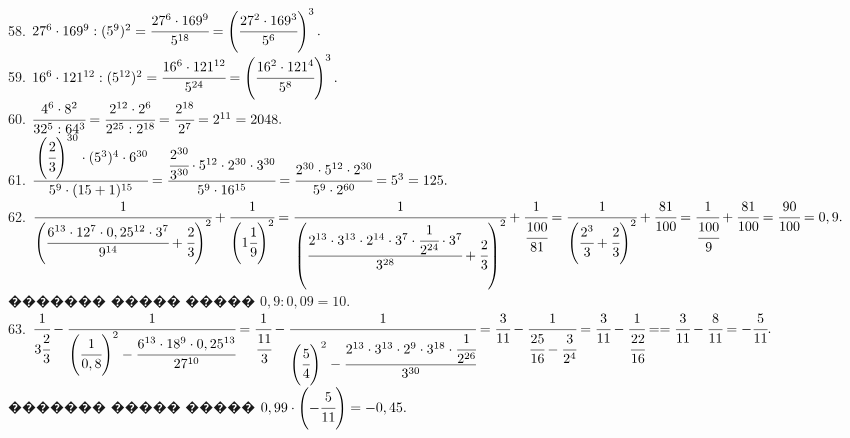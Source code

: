 \documentclass[12pt]{article}
\begin{document}
58. $27^6\cdot169^9:(5^9)^2=\cfrac{27^6\cdot169^9}{5^{18}}=\left(\cfrac{27^2\cdot169^3}{5^6}\right)^3.$\\
59. $16^6\cdot121^{12}:(5^{12})^2=\cfrac{16^6\cdot121^{12}}{5^{24}}=\left(\cfrac{16^2\cdot121^4}{5^8}\right)^3.$\\
60. $\cfrac{4^6\cdot 8^2}{32^5:64^3}=\cfrac{2^{12}\cdot 2^6}{2^{25}:2^{18}}=\cfrac{2^{18}}{2^7}=2^{11}=2048.$\\
61. $\cfrac{\left(\cfrac{2}{3}\right)^{30}\cdot(5^3)^4\cdot6^{30}}{5^9\cdot(15+1)^{15}}=\cfrac{\cfrac{2^{30}}{3^{30}}\cdot5^{12}\cdot2^{30}\cdot3^{30}}{5^9\cdot16^{15}}=
\cfrac{2^{30}\cdot5^{12}\cdot2^{30}}{5^9\cdot2^{60}}=5^3=125.$\\
62. $\cfrac{1}{\left(\cfrac{6^{13}\cdot12^7\cdot0,25^{12}\cdot3^7}{9^{14}}+\cfrac{2}{3}\right)^2}+\cfrac{1}{\left(1\cfrac{1}{9}\right)^2}=
\cfrac{1}{\left(\cfrac{2^{13}\cdot3^{13}\cdot2^{14}\cdot3^7\cdot\cfrac{1}{2^{24}}\cdot3^7}{3^{28}}+\cfrac{2}{3}\right)^2}+\cfrac{1}{\cfrac{100}{81}}=
\cfrac{1}{\left(\cfrac{2^3}{3}+\cfrac{2}{3}\right)^2}+\cfrac{81}{100}=
\cfrac{1}{\cfrac{100}{9}}+\cfrac{81}{100}=\cfrac{90}{100}=0,9.$
������� ����� ����� $0,9:0,09=10.$\\
63. $\cfrac{1}{3\cfrac{2}{3}}-\cfrac{1}{\left(\cfrac{1}{0,8}\right)^2-\cfrac{6^{13}\cdot18^9\cdot0,25^{13}}{27^{10}}}=
\cfrac{1}{\cfrac{11}{3}}-\cfrac{1}{\left(\cfrac{5}{4}\right)^2-\cfrac{2^{13}\cdot3^{13}\cdot2^9\cdot3^{18}\cdot\cfrac{1}{2^{26}}}{3^{30}}}=
\cfrac{3}{11}-\cfrac{1}{\cfrac{25}{16}-\cfrac{3}{2^4}}=\cfrac{3}{11}-\cfrac{1}{\cfrac{22}{16}}=
=\cfrac{3}{11}-\cfrac{8}{11}=-\cfrac{5}{11}.$
������� ����� ����� $0,99\cdot\left(-\cfrac{5}{11}\right)=-0,45.$
\newpage
\end{document}
